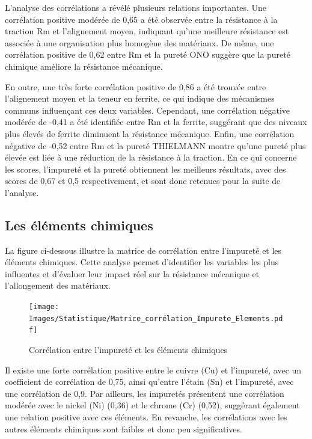 \documentclass[12pt]{article}
\begin{document}
L'analyse des corrélations a révélé plusieurs relations importantes. 
Une corrélation positive modérée de 0,65 a été observée entre la résistance
à la traction Rm et l'alignement moyen, indiquant qu'une meilleure 
résistance est associée à une organisation plus homogène des matériaux. 
De même, une corrélation positive de 0,62 entre Rm et la pureté ONO 
suggère que la pureté chimique améliore la résistance mécanique.

En outre, une très forte corrélation positive de 0,86 a été trouvée entre 
l'alignement moyen et la teneur en ferrite, ce qui indique des mécanismes 
communs influençant ces deux variables. Cependant, une corrélation 
négative modérée de -0,41 a été identifiée entre Rm et la ferrite, 
suggérant que des niveaux plus élevés de ferrite diminuent la résistance 
mécanique. Enfin, une corrélation négative de -0,52 entre Rm et la pureté 
THIELMANN montre qu'une pureté plus élevée est liée à une réduction de 
la résistance à la traction. En ce qui concerne les scores, l'impureté 
et la pureté obtiennent les meilleurs résultats, avec des scores de 0,67 
et 0,5 respectivement, et sont donc retenues pour la suite de l'analyse.


\subsection{Les éléments chimiques}



La figure ci-dessous illustre la matrice de corrélation entre l'impureté 
et les éléments chimiques. Cette analyse permet d'identifier les 
variables les plus influentes et d'évaluer leur impact réel sur 
la résistance mécanique et l'allongement des matériaux.




\begin{figure}[H]
    \texttt{[image: Images/Statistique/Matrice\_corrélation\_Impurete\_Elements.pdf]} 
    \caption{Corrélation entre l'impureté et les éléments chimiques}
    \label{fig:Corrélation2}
\end{figure}


Il existe une forte corrélation positive entre le cuivre (Cu) et 
l'impureté, avec un coefficient de corrélation de 0,75, ainsi 
qu'entre l'étain (Sn) et l'impureté, avec une corrélation de 0,9. 
Par ailleurs, les impuretés présentent une corrélation modérée avec le 
nickel (Ni) (0,36) et le chrome (Cr) (0,52), suggérant également une 
relation positive avec ces éléments. En revanche, les corrélations avec 
les autres éléments chimiques sont faibles et donc peu significatives.
\end{document}
